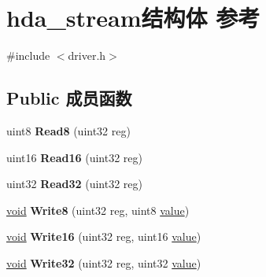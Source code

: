 \hypertarget{structhda__stream}{}\section{hda\+\_\+stream结构体 参考}
\label{structhda__stream}


{\ttfamily \#include $<$driver.\+h$>$}

\subsection*{Public 成员函数}
\begin{DoxyCompactItemize}
\item 
\mbox{\label{structhda__stream_ae4ce466b2590e888d461b9f3d0f17b96}} 
uint8 {\bfseries Read8} (uint32 reg)
\item 
\mbox{\label{structhda__stream_a35a8bf930a4bb88ad133d58009900b0b}} 
uint16 {\bfseries Read16} (uint32 reg)
\item 
\mbox{\label{structhda__stream_a883fda23c8c0ca2e83ef27b3efaa2fa0}} 
uint32 {\bfseries Read32} (uint32 reg)
\item 
\mbox{\label{structhda__stream_abfe1cbd56b2d7b99984325edbd3cf7be}} 
\hyperlink{interfacevoid}{void} {\bfseries Write8} (uint32 reg, uint8 \hyperlink{unionvalue}{value})
\item 
\mbox{\label{structhda__stream_a057d0f32e692b5b4369af6b38d57eeae}} 
\hyperlink{interfacevoid}{void} {\bfseries Write16} (uint32 reg, uint16 \hyperlink{unionvalue}{value})
\item 
\mbox{\label{structhda__stream_a585744d5e9053c7f91d762b9e9354b12}} 
\hyperlink{interfacevoid}{void} {\bfseries Write32} (uint32 reg, uint32 \hyperlink{unionvalue}{value})
\end{DoxyCompactItemize}

